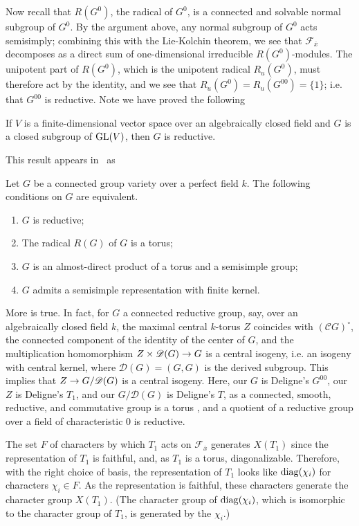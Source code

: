 \documentclass[deligne.tex]{subfiles}
\begin{document}
Now recall that $R(G^0)$, the radical of $G^0$, is a connected and
solvable normal subgroup of $G^0$. By the argument above, any normal 
subgroup of $G^0$ acts semisimply; combining this with the Lie-Kolchin 
theorem, we see that $\mathscr F_{\overline x}$ decomposes as a direct sum 
of one-dimensional irreducible $R(G^0)$-modules. The unipotent part
of $R(G^0)$, which is the unipotent radical $R_u(G^0)$, must 
therefore act by the identity, and we see that $R_u(G^0)=R_u(G^{00})=\{1\}$;
i.e. that $G^{00}$ is reductive.
Note we have proved the following
\begin{lemma*}
If $V$ is a finite-dimensional vector space over an algebraically closed
field and $G$ is a closed subgroup of $\operatorname{GL}(V)$, then $G$ is reductive.
\end{lemma*}
This result appears in~\cite[21.60]{Milne} as
\begin{proposition*}
	Let $G$ be a connected group variety over a perfect field $k$.
	The following conditions on $G$ are equivalent.
	\begin{enumerate}
		\item $G$ is reductive;
		\item The radical $R(G)$ of $G$ is a torus;
		\item $G$ is an almost-direct product of a torus and a semisimple group;
		\item $G$ admits a semisimple representation with finite kernel.
	\end{enumerate}
\end{proposition*}
More is true. In fact, for $G$ a connected reductive group, say, over
an algebraically closed field $k$, the maximal central $k$-torus $Z$
coincides with $(\mathscr CG)^\circ$, the connected component of the
identity of the center of $G$, and the multiplication homomorphism 
$Z\times\mathscr D(G)\rightarrow G$ is a central isogeny, i.e. an
isogeny with central kernel, where $\mathscr D(G)=(G,G)$ is the derived 
subgroup. This implies that $Z\rightarrow G/\mathscr D(G)$ is a central isogeny.
Here, our $G$ is Deligne's $G^{00}$, our $Z$ is Deligne's $T_1$, and
our $G/\mathscr D(G)$ is Deligne's $T$, as a connected, smooth, reductive,
and commutative group is a torus \cite[19.12]{Milne},
and a quotient of a reductive group over a field
of characteristic 0 is reductive.

The set $F$ of characters by which $T_1$ acts on $\mathscr F_{\overline x}$
generates $X(T_1)$ since the representation of $T_1$ is faithful, and, as
$T_1$ is a torus, diagonalizable. Therefore, with the right choice of basis, 
the representation of $T_1$ looks like $\operatorname{diag}(\chi_i)$ for characters 
$\chi_i\in F$. As the representation is faithful, these characters
generate the character group $X(T_1)$. (The character group of
$\operatorname{diag}(\chi_i)$, which is isomorphic to the character group of $T_1$,
is generated by the $\chi_i$.)
\end{document}
